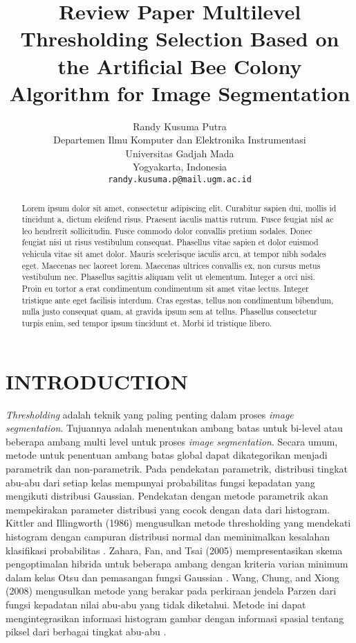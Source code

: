 \documentclass[a4paper, 10pt, conference]{ieeeconf}
\title{\LARGE \bf
Review Paper Multilevel Thresholding Selection Based on the Artificial Bee Colony Algorithm for Image Segmentation
}
\author{ \parbox{5 in}{\centering Randy Kusuma Putra\\
         Departemen Ilmu Komputer dan Elektronika Instrumentasi\\
         Universitas Gadjah Mada\\
         Yogyakarta, Indonesia\\
         {\tt\small randy.kusuma.p@mail.ugm.ac.id}}
         \hspace*{ 0.5 in}
}
\begin{document}
\maketitle
\thispagestyle{empty}
\pagestyle{empty}


\begin{abstract}

Lorem ipsum dolor sit amet, consectetur adipiscing elit. Curabitur sapien dui, mollis id tincidunt a, dictum eleifend risus. Praesent iaculis mattis rutrum. Fusce feugiat nisl ac leo hendrerit sollicitudin. Fusce commodo dolor convallis pretium sodales. Donec feugiat nisi ut risus vestibulum consequat. Phasellus vitae sapien et dolor euismod vehicula vitae sit amet dolor. Mauris scelerisque iaculis arcu, at tempor nibh sodales eget. Maecenas nec laoreet lorem. Maecenas ultrices convallis ex, non cursus metus vestibulum nec. Phasellus sagittis aliquam velit ut elementum. Integer a orci nisi. Proin eu tortor a erat condimentum condimentum sit amet vitae lectus. Integer tristique ante eget facilisis interdum. Cras egestas, tellus non condimentum bibendum, nulla justo consequat quam, at gravida ipsum sem at tellus. Phasellus consectetur turpis enim, sed tempor ipsum tincidunt et. Morbi id tristique libero.

\end{abstract}


\section{INTRODUCTION}

\textit{Thresholding} adalah teknik yang paling penting dalam proses \textit{image segmentation}. Tujuannya adalah menentukan ambang batas untuk bi-level atau beberapa ambang multi level untuk proses \textit{image segmentation}. Secara umum, metode untuk penentuan ambang batas global dapat dikategorikan menjadi parametrik dan non-parametrik. Pada pendekatan parametrik, distribusi tingkat abu-abu dari setiap kelas mempunyai probabilitas fungsi kepadatan yang mengikuti distribusi Gaussian. Pendekatan dengan metode parametrik akan mempekirakan parameter distribusi yang cocok dengan data dari histogram. 
Kittler and Illingworth (1986) mengusulkan metode thresholding yang mendekati histogram dengan campuran distribusi normal dan meminimalkan kesalahan klasifikasi probabilitas \cite{c1}. 
Zahara, Fan, and Tsai (2005) mempresentasikan skema pengoptimalan hibrida untuk beberapa ambang dengan kriteria varian minimum dalam kelas Otsu dan pemasangan fungsi Gaussian \cite{c2}. 
Wang, Chung, and Xiong (2008) mengusulkan metode yang berakar pada perkiraan jendela Parzen dari fungsi kepadatan nilai abu-abu yang tidak diketahui. Metode ini dapat mengintegrasikan informasi histogram gambar dengan informasi spasial tentang piksel dari berbagai tingkat abu-abu \cite{c3}.\par
\end{document}

